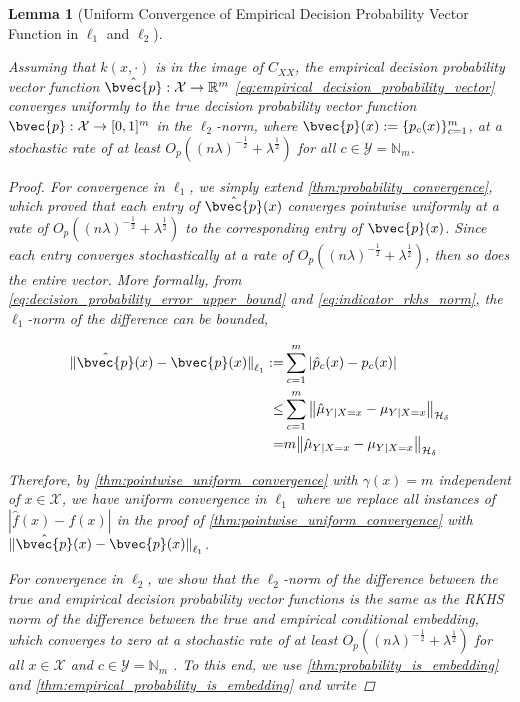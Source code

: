 \documentclass{article}
\newtheorem{lemma}{Lemma}[section]
\begin{document}
	\begin{lemma}[Uniform Convergence of Empirical Decision Probability Vector Function in $\ell_{1}$ and $\ell_{2}$]
	\label{thm:probability_vector_convergence} 
	
		Assuming that $k(x, \cdot)$ is in the image of $C_{XX}$, the empirical decision probability vector function $\hat{\bvec{p}} : \mathcal{X} \to \mathbb{R}^{m}$ \eqref{eq:empirical_decision_probability_vector} converges uniformly to the true decision probability vector function $\bvec{p} : \mathcal{X} \to [0, 1]^{m}$ in the $\ell_{2}$-norm, where $\bvec{p}(x) := \{p_{c}(x)\}_{c = 1}^{m}$, at a stochastic rate of at least $O_{p}((n \lambda)^{-\frac{1}{2}} + \lambda^{\frac{1}{2}})$ for all $c \in \mathcal{Y} = \mathbb{N}_{m}$.
		
		\begin{proof}
			For convergence in $\ell_{1}$, we simply extend \cref{thm:probability_convergence}, which proved that each entry of $\hat{\bvec{p}}(x)$ converges pointwise uniformly at a rate of $O_{p}((n \lambda)^{-\frac{1}{2}} + \lambda^{\frac{1}{2}})$ to the corresponding entry of $\bvec{p}(x)$. Since each entry converges stochastically at a rate of $O_{p}((n \lambda)^{-\frac{1}{2}} + \lambda^{\frac{1}{2}})$, then so does the entire vector. More formally, from \eqref{eq:decision_probability_error_upper_bound} and \eqref{eq:indicator_rkhs_norm}, the $\ell_{1}$-norm of the difference can be bounded,
			
			\begin{equation}
			\begin{aligned}
				{\lVert \hat{\bvec{p}}(x) - \bvec{p}(x) \rVert}_{\ell_{1}} :=& \sum_{c = 1}^{m} | \hat{p}_{c}(x) - p_{c}(x) | \\
				\leq& \sum_{c = 1}^{m} \big\| \hat{\mu}_{Y | X = x} - \mu_{Y | X = x} \big\|_{\mathcal{H}_{\delta}} \\
				=& m \big\| \hat{\mu}_{Y | X = x} - \mu_{Y | X = x} \big\|_{\mathcal{H}_{\delta}}
			\end{aligned}
			\end{equation}
			
			Therefore, by \cref{thm:pointwise_uniform_convergence} with $\gamma(x) = m$ independent of $x \in \mathcal{X}$, we have uniform convergence in $\ell_{1}$ where we replace all instances of $| \hat{f}(x) - f(x) |$ in the proof of \cref{thm:pointwise_uniform_convergence} with ${\lVert \hat{\bvec{p}}(x) - \bvec{p}(x) \rVert}_{\ell_{1}}$.
			
			For convergence in $\ell_{2}$, we show that the $\ell_{2}$-norm of the difference between the true and empirical decision probability vector functions is the same as the RKHS norm of the difference between the true and empirical conditional embedding, which converges to zero at a stochastic rate of at least $O_{p}((n \lambda)^{-\frac{1}{2}} + \lambda^{\frac{1}{2}})$ for all $x \in \mathcal{X}$ and $c \in \mathcal{Y} = \mathbb{N}_{m}$ \citep{song2009hilbert}. To this end, we use \cref{thm:probability_is_embedding} and \cref{thm:empirical_probability_is_embedding} and write 
			

\end{proof}
\end{lemma}
\end{document}
